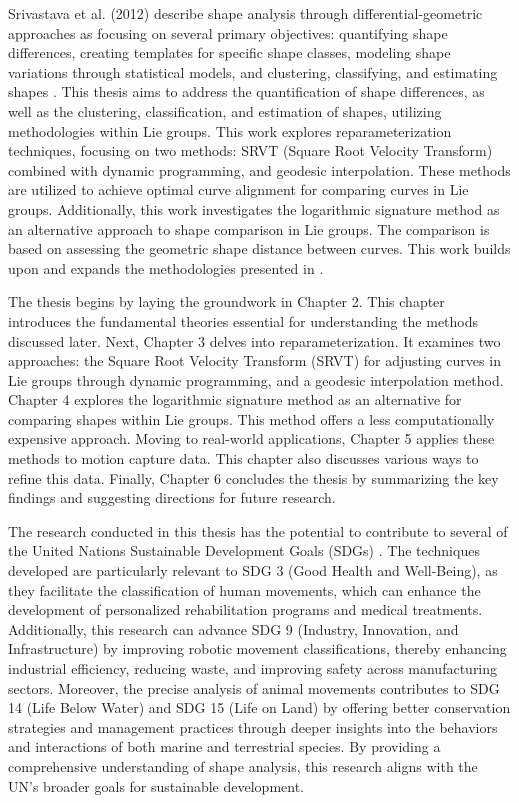 
Srivastava et al. (2012) describe shape analysis through differential-geometric approaches as focusing on several primary objectives: quantifying shape differences, creating templates for specific shape classes, modeling shape variations through statistical models, and clustering, classifying, and estimating shapes \cite{srivastavaAdvancesDifferentialgeometricApproaches2012}. This thesis aims to address the quantification of shape differences, as well as the clustering, classification, and estimation of shapes, utilizing methodologies within Lie groups. This work explores reparameterization techniques, focusing on two methods: SRVT (Square Root Velocity Transform) combined with dynamic programming, and geodesic interpolation. These methods are utilized to achieve optimal curve alignment for comparing curves in Lie groups. Additionally, this work investigates the logarithmic signature method as an alternative approach to shape comparison in Lie groups. The comparison is based on assessing the geometric shape distance between curves. This work builds upon and expands the methodologies presented in \cite{celledoniSignaturesShapeAnalysis2019}.

The thesis begins by laying the groundwork in Chapter 2. This chapter introduces the fundamental theories essential for understanding the methods discussed later. Next, Chapter 3 delves into reparameterization. It examines two approaches: the Square Root Velocity Transform (SRVT) for adjusting curves in Lie groups through dynamic programming, and a geodesic interpolation method. Chapter 4 explores the logarithmic signature method as an alternative for comparing shapes within Lie groups. This method offers a less computationally expensive approach. Moving to real-world applications, Chapter 5 applies these methods to motion capture data. This chapter also discusses various ways to refine this data. Finally, Chapter 6 concludes the thesis by summarizing the key findings and suggesting directions for future research.


The research conducted in this thesis has the potential to contribute to several of the United Nations Sustainable Development Goals (SDGs) \cite{17GOALSSustainable}. The techniques developed are particularly relevant to SDG 3 (Good Health and Well-Being), as they facilitate the classification of human movements, which can enhance the development of personalized rehabilitation programs and medical treatments. Additionally, this research can advance SDG 9 (Industry, Innovation, and Infrastructure) by improving robotic movement classifications, thereby enhancing industrial efficiency, reducing waste, and improving safety across manufacturing sectors. Moreover, the precise analysis of animal movements contributes to SDG 14 (Life Below Water) and SDG 15 (Life on Land) by offering better conservation strategies and management practices through deeper insights into the behaviors and interactions of both marine and terrestrial species. By providing a comprehensive understanding of shape analysis, this research aligns with the UN’s broader goals for sustainable development.


